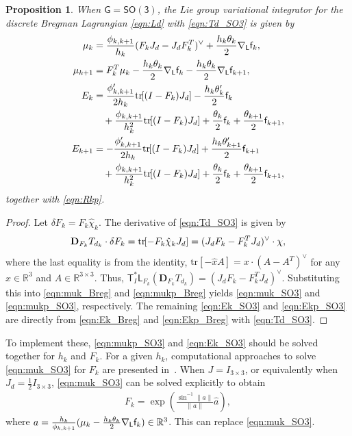 \documentclass[letterpaper, 10pt, conference]{ieeeconf}
\newcommand{\bracket}[1]{\ensuremath{\left[ #1 \right]}}
\newcommand{\tr}[1]{\mbox{tr}\ensuremath{\negthickspace\bracket{#1}}}
\newcommand{\G}{\ensuremath{\mathsf{G}}}
\newcommand{\SO}{\ensuremath{\mathsf{SO(3)}}}
\newcommand{\T}{\ensuremath{\mathsf{T}}}
\renewcommand{\L}{\ensuremath{\mathsf{L}}}
\renewcommand{\Re}{\ensuremath{\mathbb{R}}}
\newcommand{\D}{\ensuremath{\mathbf{D}}}
\newtheorem{prop}{Proposition}
\begin{document}
\begin{prop}\label{prop:DEL_Breg_SO3}
    When $\G=\SO$, the Lie group variational integrator for the discrete Bregman Lagrangian \eqref{eqn:Ld} with \eqref{eqn:Td_SO3} is given by
\begin{align}
    \mu_k & =\frac{\phi_{k,k+1}}{h_k } (F_k J_d - J_dF_k^T)^\vee + \frac{h_k\theta_k }{2} \nabla_\L \obj_k, \label{eqn:muk_SO3} \\
    \mu_{k+1}  & = F_k^T \mu_k -\frac{h_k\theta_k}{2}\nabla_\L \obj_k - \frac{h_k\theta_k}{2} \nabla_\L \obj_{k+1}, \label{eqn:mukp_SO3}\\
    E_{k} & = \frac{\phi'_{k,k+1}}{ 2 h_k} \tr{(I-F_k)J_d} -\frac{h_k\theta'_{k}}{2} \obj_{k} \nonumber\\\
          & \quad + \frac{\phi_{k,k+1}}{h_k^2} \tr{(I-F_k)J_d} + \frac{\theta_k}{2}\obj_k + \frac{\theta_{k+1}}{2}\obj_{k+1}, \label{eqn:Ek_SO3}\\
    E_{k+1} & = -\frac{\phi'_{k,k+1}}{ 2 h_k} \tr{(I-F_k)J_d} +\frac{h_k\theta'_{k+1}}{2} \obj_{k+1}\nonumber \\\
            & \quad + \frac{\phi_{k,k+1}}{h_k^2} \tr{(I-F_k)J_d} +\frac{\theta_k}{2}\obj_k + \frac{\theta_{k+1}}{2}\obj_{k+1}, \label{eqn:Ekp_SO3}
\end{align}
together with \eqref{eqn:Rkp}.
\end{prop}
\begin{proof}
    Let $\delta F_k = F_k \hat\chi_k$.
    The derivative of \eqref{eqn:Td_SO3} is given by
    \begin{align*}
        \D_{F_k} T_{d_k} \cdot \delta F_k = \tr{-F_k\hat\chi_k J_d} = (J_dF_k - F_k^T J_d)^\vee \cdot \chi,
    \end{align*}
    where the last equality is from the identity, $\mathrm{tr}[-\hat x A]= x\cdot (A-A^T)^\vee$ for any $x\in\Re^3$ and $A\in\Re^{3\times 3}$.
    Thus, $\T^*_I \L_{F_k} (\D_{F_k} T_{d_k}) = (J_dF_k - F_k^T J_d)^\vee $. 
    Substituting this into \eqref{eqn:muk_Breg} and \eqref{eqn:mukp_Breg} yields \eqref{eqn:muk_SO3} and \eqref{eqn:mukp_SO3}, respectively. 
    The remaining \eqref{eqn:Ek_SO3} and \eqref{eqn:Ekp_SO3} are directly from \eqref{eqn:Ek_Breg} and \eqref{eqn:Ekp_Breg} with \eqref{eqn:Td_SO3}.
\end{proof}
To implement these, \eqref{eqn:mukp_SO3} and \eqref{eqn:Ek_SO3} should be solved together for $h_k$ and $F_k$.
For a given $h_k$, computational approaches to solve \eqref{eqn:muk_SO3} for $F_k$ are presented in~\cite[Sec 3.3.8]{Lee08}.
When $J=I_{3\times 3}$, or equivalently when $J_d = \frac{1}{2}I_{3\times 3}$, \eqref{eqn:muk_SO3} can be solved explicitly to obtain
\begin{align}
    F_k = \exp (\frac{\sin^{-1}\|a\|}{\|a\|}\hat a),\label{eqn:Fk_SO3}
\end{align}
where $a = \frac{h_k}{\phi_{k,k+1}} (\mu_k - \frac{h_k\theta_k}{2}\nabla_\L \obj_k)\in\Re^3$.
This can replace \eqref{eqn:muk_SO3}.
\end{document}
